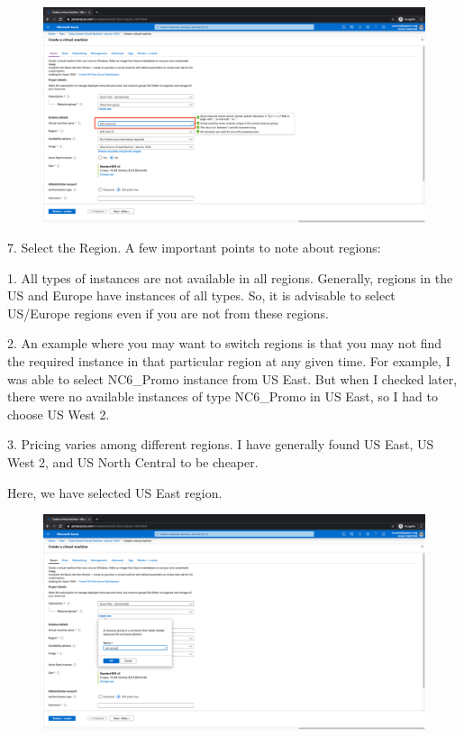 \begin{figure}[H]
\begin{center} 
\includegraphics[scale=0.20]{figures/vm6}
\end{center}
\end{figure}

7. Select the Region.
A few important points to note about regions:

1. All types of instances are not available in all regions. Generally, regions in the US and Europe have instances of all types. So, it is advisable to select US/Europe regions even if you are not from these regions.

2. An example where you may want to switch regions is that you may not find the required instance in that particular region at any given time. For example, I was able to select NC6\_Promo instance from US East. But when I checked later, there were no available instances of type NC6\_Promo in US East, so I had to choose US West 2.

3. Pricing varies among different regions. I have generally found US East, US West 2, and US North Central to be cheaper.

Here, we have selected US East region.

\begin{figure}[H]
\begin{center} 
\includegraphics[scale=0.20]{figures/vm5}
\end{center}
\end{figure}

